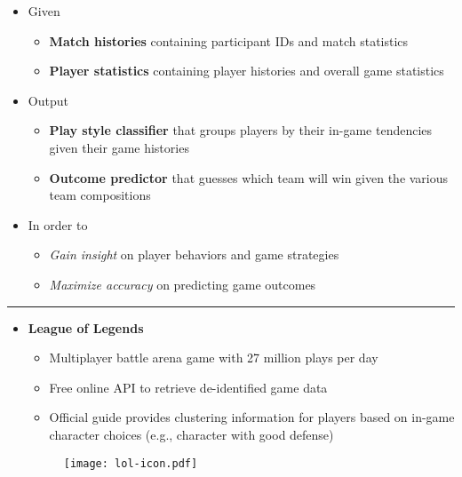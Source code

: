 \documentclass[a0]{a0poster}
\def\Head#1{\noindent{\LARGE\color{bluegray} #1}\bigskip}
\begin{document}
\begin{textblock}{7.0}
\begin{itemize}

  \item Given
  \begin{itemize}
    \item \textbf{Match histories} containing participant IDs and match statistics
    \item \textbf{Player statistics} containing player histories and overall game statistics
  \end{itemize}

  \item Output
  \begin{itemize}
    \item \textbf{Play style classifier} that groups players by their in-game tendencies given their game histories
    \item \textbf{Outcome predictor} that guesses which team will win given the various team compositions
  \end{itemize}

  \item In order to
  \begin{itemize}
    \item \emph{Gain insight} on player behaviors and game strategies
    \item \emph{Maximize accuracy} on predicting game outcomes
  \end{itemize} 

\end{itemize}

\medskip
\hrule\medskip
\Head{Target Game}

\begin{multicols}{2}
  \begin{itemize}
    
    \item \textbf{League of Legends}
    \begin{itemize}
      \item Multiplayer battle arena game with 27 million plays per day
      \item Free online API to retrieve de-identified game data
      \item Official guide provides clustering information for players based on in-game character choices (e.g., character with good defense)
    \end{itemize}

    \vspace{30pt}

    \begin{figure}[!h]
      \centering
      \texttt{[image: lol-icon.pdf]}
      \label{fig:lol}
    \end{figure}

  \end{itemize}
\end{multicols}

\end{textblock}
\end{document}
